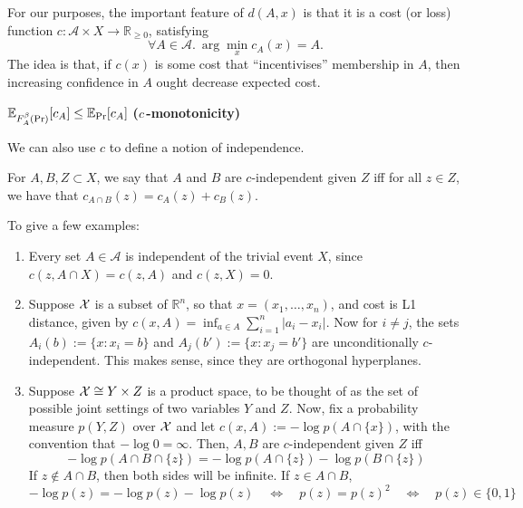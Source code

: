 \documentclass{article}
\begin{document}
For our purposes, the important feature of $d(A,x)$ is that it is a cost (or loss) function $c :\mathcal A \times X \to \mathbb R_{\ge 0}$, satisfying
\[
\forall A \in \mathcal A.~\arg\min_{x} c_A(x) = A.
\]
The idea is that, if $c(x)$ is some cost that ``incentivises'' membership in $A$, then increasing confidence in $A$ ought decrease expected cost.
\begin{URaxioms}
    \item $\operatorname*{\mathbb{E}}_{F^{\beta}_A(\Pr)} [ c_A ]
        \le
        \operatorname*{\mathbb{E}}_{\Pr}[ c_A ]
    $
        \hfill \textbf{($c$\,-monotonicity)}
\end{URaxioms}


We can also use $c$ to define a notion of independence.

\begin{defn}[$c$-independence]
For $A,B,Z \subset X$,
we say that $A$ and $B$ are $c$-independent given $Z$ iff
for all $z \in Z$, we have that
$c_{A\cap B}(z) = c_{A}(z) + c_{B}(z)$.
\end{defn}

To give a few examples:
\begin{enumerate}
    \item Every set $A \in\mathcal A$ is independent of the trivial event $X$, since
        $
            c(z, A\cap X) = c(z, A)
        $
        and $c(z, X) = 0$.
    \item Suppose $\mathcal X$ is a subset of $\mathbb R^n$, so that $x = (x_1, \ldots, x_n)$, and cost is L1 distance, given by $c(x,A) = \inf_{a \in A} \sum_{i=1}^n {|a_i - x_i|}$. Now for $i\ne j$,
    the sets $A_i(b) := \{ x : x_i = b \}$
    and $A_j(b') := \{x : x_j = b' \}$ are unconditionally $c$-independent.
    This makes sense, since they are orthogonal hyperplanes.

    \item  Suppose $\mathcal X \cong Y \times Z$ is a product space, to be thought of as the set of possible joint settings of two variables $Y$ and $Z$.
    Now, fix a probability measure $p(Y,Z)$ over $\mathcal X$
    and let
    $c(x, A) := -\log p(A \cap \{x\})$, with the convention that $-\log 0 = \infty$.
    Then, $A, B$ are $c$-independent given $Z$ iff
    \[
        - \log p(A \cap B \cap \{z\}) =
        - \log p(A \cap \{z\}) - \log p(B \cap \{z\})
    \]
    If $z \notin A \cap B$, then both sides will be infinite. If $z \in A \cap B$,
    \[
        - \log p(z) = - \log p(z) - \log p(z)
        \quad\iff\quad
        p(z) = p(z)^2
        \quad\iff\quad
        p(z) \in \{0,1\}
    \]
\end{enumerate}
\end{document}
